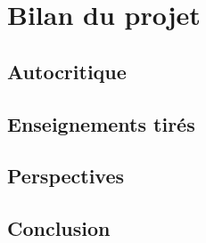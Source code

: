 \chapter{Bilan du projet}

\section{Autocritique}


\section{Enseignements tirés}


\section{Perspectives}


\section{Conclusion}

